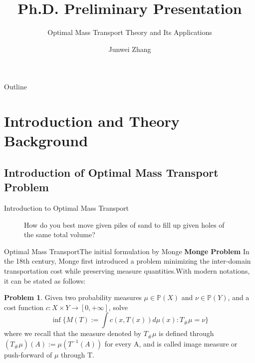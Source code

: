 \documentclass{beamer}
\title{Ph.D. Preliminary Presentation}
\subtitle{Optimal Mass Transport Theory and Its Applications}
\author{Junwei Zhang}
\institute[Stony Brook University] %
{

  Department of Applied Mathematics and Statistics\\
  Stony Brook University
}
\theoremstyle{definition}
\newtheorem{mypro}{Problem}
\begin{document}
\begin{frame}
  \titlepage
\end{frame}

\begin{frame}{Outline}
  \tableofcontents
\end{frame}

\section{Introduction and Theory Background}

\subsection{Introduction of Optimal Mass Transport Problem}
\begin{frame}{Introduction to Optimal Mass Transport}
\centering

\begin{figure}
\centering
{}
\caption{How do you best move given piles of sand to fill up given holes of the same total volume?}
\label{fig:piles}
\end{figure}

\end{frame}


\begin{frame}{Optimal Mass Transport}{The initial formulation by Monge\cite{monge1781memoire}}
\textbf{Monge Problem}
In the 18th century, Monge first introduced a problem minimizing the inter-domain transportation cost while preserving measure quantities.With modern notations, it can be stated as follows:
\begin{mypro}
Given two probability measures $\mu \in \mathbb{P}(X)$ and $\nu \in \mathbb{P}(Y) $, and a cost function $c : X \times Y \rightarrow [0,+\infty]$, solve $$\inf \{M(T) := \int c(x,T(x)) d\mu(x): T_{\#}\mu=\nu\}$$
where we recall that the measure denoted by $T_{\#}\mu$ is defined through $(T_{\#}\mu)(A):=\mu(T^{-1}(A))$ for every A, and is called image measure or push-forward of $\mu$ through T.
\label{Pro:Monge}
\end{mypro}

\end{frame}
\end{document}
